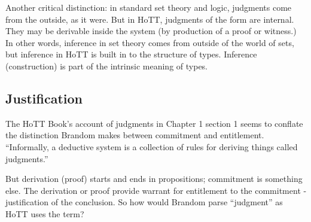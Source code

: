 Another critical distinction: in standard set theory and logic,
judgments come from the outside, as it were.  But in HoTT, judgments
of the form \atypeA are internal.  They may be derivable inside the
system (by production of a proof or witness.)  In other words,
inference in set theory comes from outside of the world of sets, but
inference in HoTT is built in to the structure of types.  Inference
(construction) is part of the intrinsic meaning of types.

\subsection{Justification}
\label{subs:just}

The HoTT Book's account of judgments in Chapter 1 section 1 seems to
conflate the distinction Brandom makes between commitment and
entitlement.  ``Informally, a deductive system is a collection of
rules for deriving things called judgments.''

But derivation (proof) starts and ends in propositions; commitment is
something else.  The derivation or proof provide warrant for
entitlement to the commitment - justification of the conclusion.  So
how would Brandom parse ``judgment'' as HoTT uses the term?

